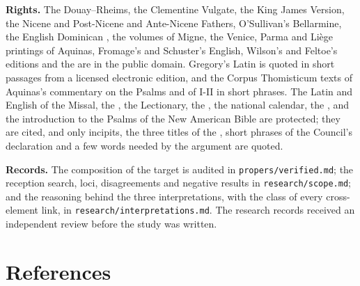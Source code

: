 {\textbf{Rights.} The Douay--Rheims, the Clementine Vulgate, the King James
Version, the Nicene and Post-Nicene and Ante-Nicene Fathers, O'Sullivan's
Bellarmine, the English Dominican , the volumes of Migne, the
Venice, Parma and Li\`ege printings of Aquinas, Fromage's and Schuster's
English, Wilson's and Feltoe's editions and the 
are in the public domain. Gregory's Latin is quoted in short passages from a
licensed electronic edition, and the Corpus Thomisticum texts of Aquinas's
commentary on the Psalms and of  I-II in short phrases. The Latin
and English of the Missal, the , the Lectionary,
the , the national calendar, the ,  and the introduction to the Psalms of the New
American Bible are protected; they are cited, and only incipits, the three
titles of the , short phrases of the Council's declaration and a few
words needed by the argument are quoted.

\textbf{Records.} The composition of the target is audited in
\texttt{propers/verified.md}; the reception search, loci, disagreements and
negative results in \texttt{research/scope.md}; and the reasoning behind the
three interpretations, with the class of every cross-element link, in
\texttt{research/interpretations.md}. The research records received an
independent review before the study was written.
\par}

\section*{References}
\label{sec:references}

